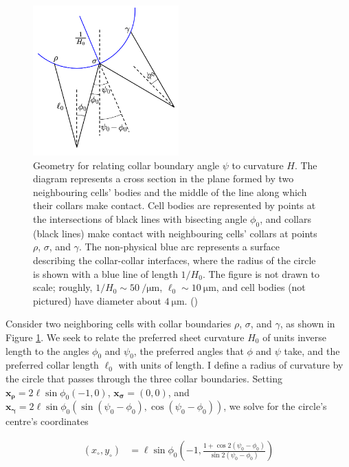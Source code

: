 \begin{figure}[htbp]
    \centering
    \includegraphics[width=0.5\textwidth]{hpsi.png}
    \caption[Geometry of sheet curvature]{Geometry for relating collar boundary angle $\psi$ to curvature $H$. The diagram represents a cross section in the plane formed by two neighbouring cells' bodies and the middle of the line along which their collars make contact. Cell bodies are represented by points at the intersections of black lines with bisecting angle $\phi_0$, and collars (black lines) make contact with neighbouring cells' collars at points $\rho$, $\sigma$, and $\gamma$. The non-physical blue arc represents a surface describing the collar-collar interfaces, where the radius of the circle is shown with a blue line of length $1/H_0$. The figure is not drawn to scale; roughly, $1/H_0 \sim \SI{50}{\per\micro\meter}$, $\ell_0 \sim \SI{10}{\micro\meter}$, and cell bodies (not pictured) have diameter about $\SI{4}{\micro\meter}$. ()}
    \label{fig:hpsi}
\end{figure}

Consider two neighboring cells with collar boundaries $\rho$, $\sigma$, and $\gamma$, as shown in Figure \ref{fig:hpsi}. 
We seek to relate the preferred sheet curvature $H_0$ of units inverse length to the angles $\phi_0$ and $\psi_0$, the preferred angles that $\phi$ and $\psi$ take, and the preferred collar length $\ell_0$ with units of length.
I define a radius of curvature by the circle that passes through the three collar boundaries. 
Setting $\bm{x_\rho} = 2\ell\sin\phi_0(-1, 0)$, $\bm{x_\sigma} = (0,0)$, and $\bm{x_\gamma} = 2\ell\sin\phi_0 (\sin(\psi_0 - \phi_0), \cos(\psi_0-\phi_0))$, we solve for the circle's centre's coordinates 

\begin{align*}
    (x_\circ, y_\circ) &= \ell \sin\phi_0\left(-1, \frac{1+\cos2(\psi_0 - \phi_0)}{\sin2(\psi_0 - \phi_0)} \right)
\end{align*}

